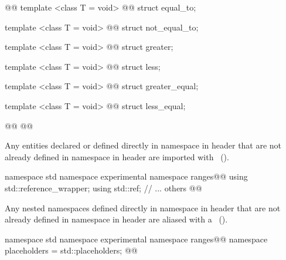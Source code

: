 \begin{codeblock}
@@
  template <class T = void>
    @@
  struct equal_to;
  
  template <class T = void>
    @@
  struct not_equal_to;
  
  template <class T = void>
    @@
  struct greater;
  
  template <class T = void>
    @@
  struct less;
  
  template <class T = void>
    @@
  struct greater_equal;
  
  template <class T = void>
    @@
  struct less_equal;
  
  @@
@\added{\}\}\}}\newtxt{\}}@
\end{codeblock}

{\color{addclr}
\pnum
Any entities declared or defined directly in namespace  in header 
that are not already defined in namespace  in header
 are imported with
~(). \enterexample
\begin{codeblock}
namespace std { namespace experimental { namespace ranges@@ {
  using std::reference_wrapper;
  using std::ref;
  // ... others
}}}@\newtxt{\}}@
\end{codeblock}
\exitexample

\pnum
Any nested namespaces defined directly in namespace  in header 
that are not already defined in namespace  in header
 are aliased with a
~(). \enterexample
\begin{codeblock}
namespace std { namespace experimental { namespace ranges@@ {
  namespace placeholders = std::placeholders;
}}}@\newtxt{\}}@
\end{codeblock}
\exitexample
}

